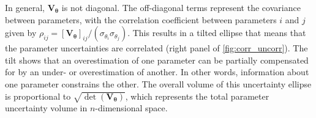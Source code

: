 In general, $\mathbf{V}_{\boldsymbol{\theta}}$ is not diagonal. The off-diagonal terms represent the covariance between parameters, with the correlation coefficient between parameters $i$ and $j$ given by $\rho_{ij} = [\mathbf{V}_{\boldsymbol{\theta}}]_{ij}/(\sigma_{\theta_i}\sigma_{\theta_j})$. This results in a tilted ellipse that means that the parameter uncertainties are correlated (right panel of \autoref{fig:corr_uncorr}). The tilt shows that an overestimation of one parameter can be partially compensated for by an under- or overestimation of another. In other words, information about one parameter constrains the other. The overall volume of this uncertainty ellipse is proportional to $\sqrt{\det(\mathbf{V}_{\boldsymbol{\theta}})}$, which represents the total parameter uncertainty volume in $n$-dimensional space.

